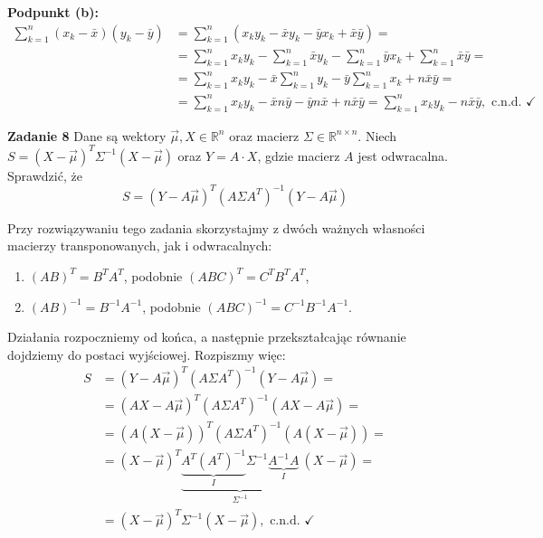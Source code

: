 \documentclass[a4paper,12pt]{article}
\begin{document}
\noindent \textbf{Podpunkt (b):}
\begin{align*}
    \sum\limits_{k=1}^{n} (x_k - \bar{x})(y_k - \bar{y}) &= 
        \sum\limits_{k=1}^{n} \left(
            x_k y_k - \bar{x} y_k - \bar{y} x_k + \bar{x} \bar{y}
        \right) = \\
    &= \sum\limits_{k=1}^{n} x_k y_k - \sum\limits_{k=1}^{n} \bar{x} y_k
       - \sum\limits_{k=1}^{n} \bar{y} x_k + \sum\limits_{k=1}^{n} \bar{x} \bar{y} = \\
    &= \sum\limits_{k=1}^{n} x_k y_k - \bar{x} \sum\limits_{k=1}^{n} y_k
       - \bar{y} \sum\limits_{k=1}^{n} x_k + n \bar{x} \bar{y} = \\
    &= \sum\limits_{k=1}^{n} x_k y_k - \bar{x} n \bar{y} - \bar{y} n \bar{x} + n \bar{x} \bar{y} =
       \sum\limits_{k=1}^{n} x_k y_k - n \bar{x} \bar{y}, \text{ c.n.d. } \checkmark
\end{align*}

\newpage
\noindent \textbf{Zadanie 8} \newline
Dane są wektory $\vec{\mu}, X \in \mathbb{R}^n$ oraz macierz $\Sigma \in 
\mathbb{R}^{n \times n}$. Niech $S = (X - \vec{\mu})^T \Sigma^{-1} (X - \vec{\mu})$
oraz $Y = A \cdot X$, gdzie macierz $A$ jest odwracalna. Sprawdzić, że
\[
    S = (Y - A\vec{\mu})^T \left(A \Sigma A^T\right)^{-1} (Y - A\vec{\mu})
\]

\noindent Przy rozwiązywaniu tego zadania skorzystajmy z dwóch ważnych własności
macierzy transponowanych, jak i odwracalnych:
\begin{enumerate}
    \item $(AB)^T = B^T A^T$, podobnie $(ABC)^T = C^T B^T A^T$,
    \item $(AB)^{-1} = B^{-1} A^{-1}$, podobnie $(ABC)^{-1} = C^{-1} B^{-1} A^{-1}$.
\end{enumerate}

\noindent Działania rozpoczniemy od końca, a następnie przekształcając równanie
dojdziemy do postaci wyjściowej. Rozpiszmy więc:
\begin{align*}
    S   &= (Y - A\vec{\mu})^T \left(A \Sigma A^T\right)^{-1} (Y - A\vec{\mu}) = \\
        &= (A X - A\vec{\mu})^T \left(A \Sigma A^T\right)^{-1} (A X - A\vec{\mu}) = \\
        &= (A (X - \vec{\mu}))^T \left(A \Sigma A^T\right)^{-1} (A (X - \vec{\mu})) = \\
        &= (X - \vec{\mu})^T \underbrace{
            \underbrace{A^T (A^T)^{-1}}_{I}
            \Sigma^{-1}
            \underbrace{A^{-1} A}_{I}
        }_{\Sigma^{-1}} \ (X - \vec{\mu}) = \\
        &= (X - \vec{\mu})^T \Sigma^{-1} (X - \vec{\mu}),
            \text{ c.n.d. } \checkmark
\end{align*}
\end{document}
